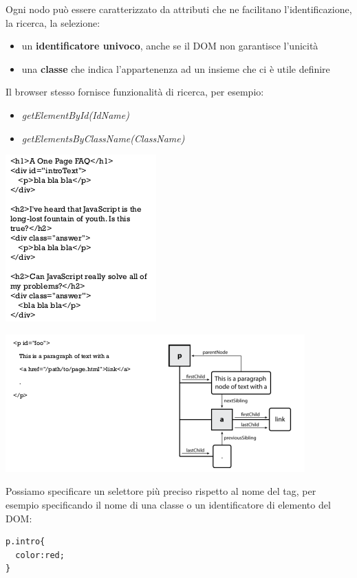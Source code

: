 \documentclass[a4paper,12pt, oneside]{book}
\begin{document}
\newpage
Ogni nodo può essere caratterizzato da
attributi che ne facilitano l'identificazione, la ricerca, la selezione:
\begin{itemize}
	\item un \textbf{identificatore univoco}, anche se il DOM non garantisce l'unicità
	\item una \textbf{classe} che indica l'appartenenza ad
	      un insieme che ci è utile definire
\end{itemize}
Il browser stesso fornisce funzionalità di ricerca, per esempio:
\begin{itemize}
	\item \textit{getElementById(IdName)}
	\item \textit{getElementsByClassName(ClassName)}
\end{itemize}
\begin{center}
	\includegraphics[scale=2.9]{img/dom2.png}
\end{center}
\begin{center}
	\includegraphics[scale=0.9]{img/dom3.png}
\end{center}
\newpage
Possiamo specificare un selettore più preciso rispetto al
nome del tag, per esempio specificando il nome di una
classe o un identificatore di elemento del DOM:
\begin{verbatim}
p.intro{
  color:red;
}
\end{verbatim}
\end{document}
